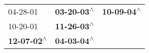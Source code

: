 \begin{supertabular}{lll}
                  04-28-01\textsuperscript{} &  \textbf{03-20-03\textsuperscript{$\wedge$}} &  \textbf{10-09-04\textsuperscript{$\wedge$}} \\
                  10-20-01\textsuperscript{} &  \textbf{11-26-03\textsuperscript{$\wedge$}} &                                              \\
 \textbf{12-07-02\textsuperscript{$\wedge$}} &  \textbf{04-03-04\textsuperscript{$\wedge$}} &                                              \\
\end{supertabular}
